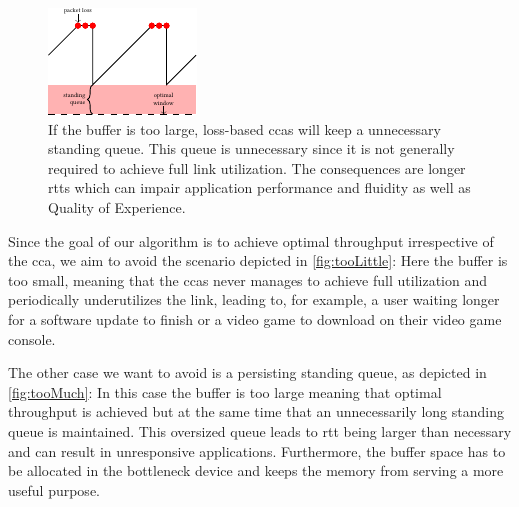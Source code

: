 \documentclass[10pt,sigconf,letterpaper,dvipsnames\ifx\removeHeaders\tempYes ,nonacm\fi\ifx\removeHeaders\tempNo ,anonymous\fi]{acmart}
\begin{document}
\begin{figure}[h]
\includegraphics[width=\columnwidth]{figures/traq_illustration_too_much.pdf}
\caption{If the buffer is too large, loss-based \glspl{cca} will keep a unnecessary standing queue. This queue is unnecessary since it is not generally required to achieve full link utilization. The consequences are longer \glspl{rtt} which can impair application performance and fluidity as well as Quality of Experience.}
\label{fig:tooMuch}
\end{figure}

Since the goal of our algorithm is to achieve optimal throughput irrespective of the \gls{cca}, we aim to avoid the scenario depicted in \autoref{fig:tooLittle}: Here the buffer is too small, meaning that the \glspl{cca} never manages to achieve full utilization and periodically underutilizes the link, leading to, for example, a user waiting longer for a software update to finish or a video game to download on their video game console. 

The other case we want to avoid is a persisting standing queue, as depicted in \autoref{fig:tooMuch}: In this case the buffer is too large meaning that optimal throughput is achieved but at the same time that an unnecessarily long standing queue is maintained. This oversized queue leads to \gls{rtt} being larger than necessary and can result in unresponsive applications. Furthermore, the buffer space has to be allocated in the bottleneck device and keeps the memory from serving a more useful purpose. 
\end{document}
